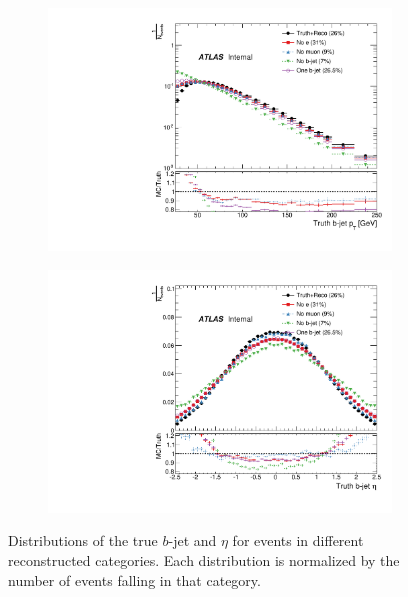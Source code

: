 \begin{figure}[bth]
\centering
\begin{subfigure}[]{0.45\textwidth}
\includegraphics[width=\textwidth]{fig/TruthNotReco/TruthBJetPt.pdf}
\end{subfigure}
\begin{subfigure}[]{0.45\textwidth}
\includegraphics[width=\textwidth]{fig/TruthNotReco/TruthBJetEta.pdf}
\end{subfigure}
\caption{Distributions of the true $b$-jet \pt and $\eta$ for events in different reconstructed categories. Each distribution is normalized by the number of events falling in that category. }
\label{fig:norecobjet}
\end{figure}

